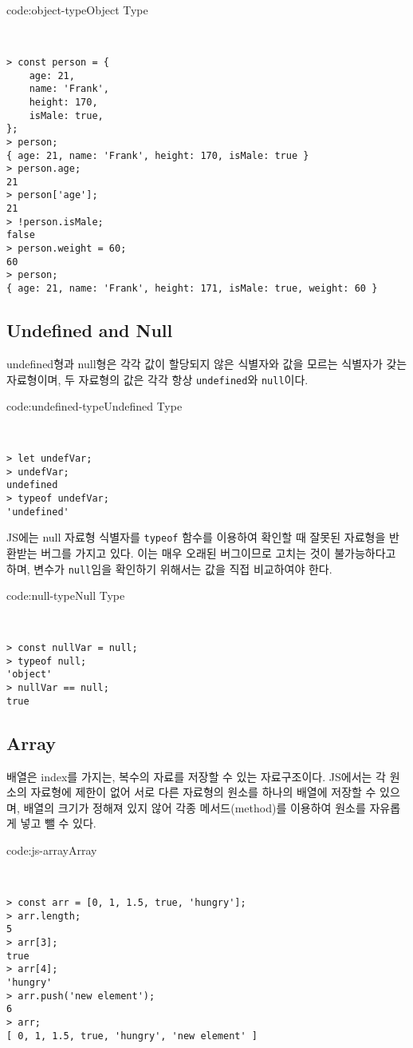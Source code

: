\begin{codeenv}{code:object-type}{Object Type}\begin{verbatim}


> const person = {
    age: 21,
    name: 'Frank',
    height: 170,
    isMale: true,
};
> person;
{ age: 21, name: 'Frank', height: 170, isMale: true }
> person.age;
21
> person['age'];
21
> !person.isMale;
false
> person.weight = 60;
60
> person;
{ age: 21, name: 'Frank', height: 171, isMale: true, weight: 60 }
\end{verbatim}
\end{codeenv}

\subsection*{Undefined and Null}

undefined형과 null형은 각각 값이 할당되지 않은 식별자와 값을 모르는 식별자가 갖는 자료형이며, 두 자료형의 값은 각각 항상 \texttt{undefined}와 \texttt{null}이다.

\begin{codeenv}{code:undefined-type}{Undefined Type}\begin{verbatim}


> let undefVar;
> undefVar;
undefined
> typeof undefVar;
'undefined'
\end{verbatim}
\end{codeenv}

JS에는 null 자료형 식별자를 \texttt{typeof} 함수를 이용하여 확인할 때 잘못된 자료형을 반환받는 버그를 가지고 있다. 이는 매우 오래된 버그이므로 고치는 것이 불가능하다고 하며, 변수가 \texttt{null}임을 확인하기 위해서는 값을 직접 비교하여야 한다.
\newpage

\begin{codeenv}{code:null-type}{Null Type}\begin{verbatim}


> const nullVar = null;
> typeof null;
'object'
> nullVar == null;
true
\end{verbatim}
\end{codeenv}

\subsection*{Array}

배열은 index를 가지는, 복수의 자료를 저장할 수 있는 자료구조이다. JS에서는 각 원소의 자료형에 제한이 없어 서로 다른 자료형의 원소를 하나의 배열에 저장할 수 있으며, 배열의 크기가 정해져 있지 않어 각종 메서드(method)를 이용하여 원소를 자유롭게 넣고 뺄 수 있다.

\begin{codeenv}{code:js-array}{Array}\begin{verbatim}


> const arr = [0, 1, 1.5, true, 'hungry'];
> arr.length;
5
> arr[3];
true
> arr[4];
'hungry'
> arr.push('new element');
6
> arr;
[ 0, 1, 1.5, true, 'hungry', 'new element' ]
\end{verbatim}
\end{codeenv}

